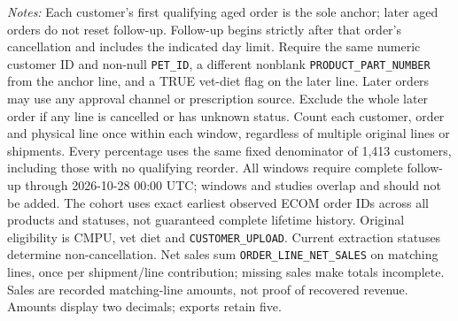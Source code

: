 \begin{table}[!htbp]
\begin{minipage}{\linewidth}
\footnotesize
\textit{Notes:} Each customer's first qualifying aged order is the sole anchor;
later aged orders do not reset follow-up. Follow-up begins strictly after that
order's cancellation and includes the indicated day limit. Require the same numeric customer ID and non-null \texttt{PET\_ID}, a different nonblank \texttt{PRODUCT\_PART\_NUMBER} from the anchor line, and a TRUE vet-diet flag on the later line. Later orders may use any approval channel or prescription
source. Exclude the whole later order if any line is cancelled or has unknown
status. Count each customer, order and physical line once within each window,
regardless of multiple original lines or shipments. Every percentage uses the
same fixed denominator of 1,413 customers, including those with no
qualifying reorder. All windows require complete follow-up through
2026-10-28 00:00 UTC; windows and studies overlap and should not be added.
The cohort uses exact earliest observed ECOM order IDs across all products and statuses, not guaranteed complete lifetime history. Original eligibility is CMPU,
vet diet and \texttt{CUSTOMER\_UPLOAD}. Current extraction statuses determine
non-cancellation. Net sales sum \texttt{ORDER\_LINE\_NET\_SALES} on matching
lines, once per shipment/line contribution; missing sales make totals incomplete.
Sales are recorded matching-line amounts, not proof of recovered revenue.
Amounts display two decimals; exports retain five.
\end{minipage}
\end{table}
